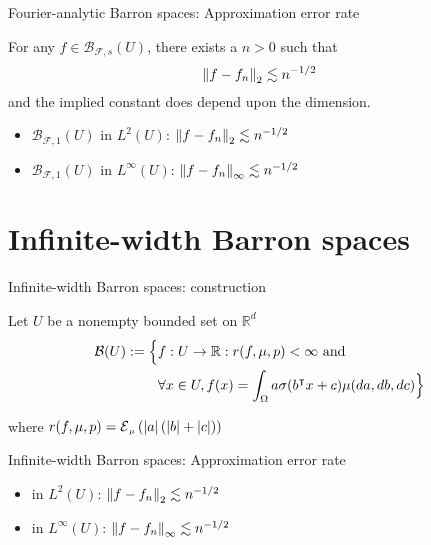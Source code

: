 \documentclass[aspectratio=32]{beamer}
\begin{document}
\begin{frame}{Fourier-analytic Barron spaces: Approximation error rate}

    \begin{theorem}
        For any $f \in \mathcal{B}_{\mathcal{F},s}(U)$, there exists a $n > 0$
        such that 
        \begin{equation}
            \left\| f - f_n \right\|_2 \lesssim n^{-1/2}
        \end{equation}
        and the implied constant does depend upon the dimension.
    \end{theorem}

    \begin{itemize}
        \item $\mathcal{B}_{\mathcal{F},1}(U)$ in $L^{2}(U)$: $\left\| f - f_n \right\|_2
        \lesssim n^{-1/2}$
        \item $\mathcal{B}_{\mathcal{F},1}(U)$ in $L^{\infty}(U)$: $\left\| f -
        f_n \right\|_{\infty} \lesssim n^{-1/2}$
    \end{itemize}



\end{frame}

\section{Infinite-width Barron spaces}

\begin{frame}{Infinite-width Barron spaces: construction}
    
    Let $U$ be a nonempty bounded set on $\mathbb{R}^d$
    \begin{align*}
        \mathcal{B}(U) := \Big\{
            &f: U \to \mathbb{R}: r(f, \mu, p) < \infty  \textnormal{ and } \\
            &\forall x\in U, 
             f(x) = \int_{\Omega} a \sigma(b{}^{\intercal} x + c) \mu(da, db, dc)
        \Big\}
    \end{align*}

    where $r(f, \mu, p) = \ERWi{\mu}{\abs{a} (\abs{b} + \abs{c})}$
\end{frame}

\begin{frame}{Infinite-width Barron spaces: Approximation error rate}
    \begin{itemize}
        \item in $L^{2}(U)$: $\left\| f - f_n \right\|_2 \lesssim n^{-1/2}$
        \item in $L^{\infty}(U)$: $\left\| f - f_n \right\|_{\infty} \lesssim n^{-1/2}$
    \end{itemize}


\end{frame}
\end{document}
